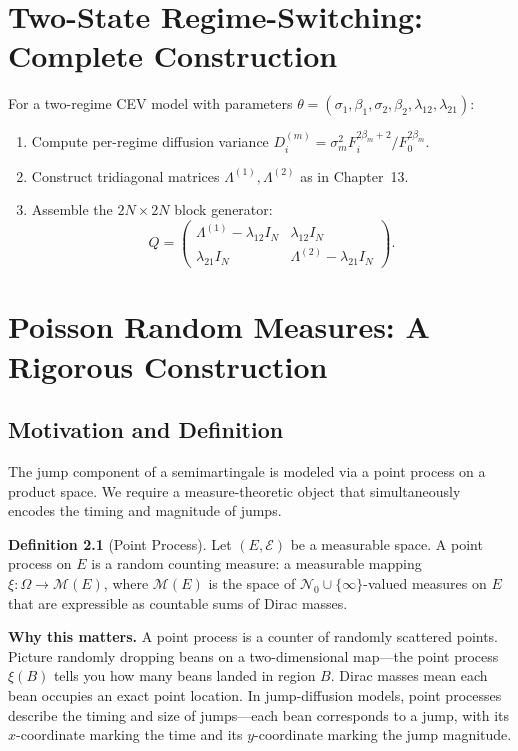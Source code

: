 \documentclass[11pt,a4paper,openany]{book}
\theoremstyle{definition}
\newtheorem{definition}{Definition}[chapter]
\theoremstyle{plain}
\theoremstyle{remark}
\newcommand{\1}{\mathbbm{1}}
\newcommand{\N}{\mathcal{N}}
\newcommand{\M}{\mathcal{M}}
\newcommand{\calE}{\mathcal{E}}
\begin{document}
\chapter{Two-State Regime-Switching: Complete Construction}

For a two-regime CEV model with parameters $\theta = (\sigma_{1}, \beta_{1}, \sigma_{2}, \beta_{2}, \lambda_{12}, \lambda_{21})$:
\begin{enumerate}[label=(\arabic*)]
    \item Compute per-regime diffusion variance $D_{i}^{(m)} = \sigma_{m}^{2} F_{i}^{2\beta_{m}+2} / F_{0}^{2\beta_{m}}$.
    \item Construct tridiagonal matrices $\Lambda^{(1)}, \Lambda^{(2)}$ as in Chapter~13.
    \item Assemble the $2N \times 2N$ block generator:
    \[
    Q = \begin{pmatrix}
    \Lambda^{(1)} - \lambda_{12} I_{N} & \lambda_{12} I_{N} \\[4pt]
    \lambda_{21} I_{N} & \Lambda^{(2)} - \lambda_{21} I_{N}
    \end{pmatrix}.
    \]
\end{enumerate}

\chapter{Poisson Random Measures: A Rigorous Construction}

\section{Motivation and Definition}

The jump component of a semimartingale is modeled via a point process on a product space. We require a measure-theoretic object that simultaneously encodes the timing and magnitude of jumps.

\begin{definition}[Point Process]
Let $(E, \calE)$ be a measurable space. A point process on $E$ is a random counting measure: a measurable mapping $\xi: \Omega \to \M(E)$, where $\M(E)$ is the space of $\N_{0} \cup \{\infty\}$-valued measures on $E$ that are expressible as countable sums of Dirac masses.
\end{definition}

\medskip
\noindent\textbf{Why this matters.} A point process is a counter of randomly scattered points. Picture randomly dropping beans on a two-dimensional map---the point process $\xi(B)$ tells you how many beans landed in region $B$. Dirac masses mean each bean occupies an exact point location. In jump-diffusion models, point processes describe the timing and size of jumps---each bean corresponds to a jump, with its $x$-coordinate marking the time and its $y$-coordinate marking the jump magnitude.
\end{document}

